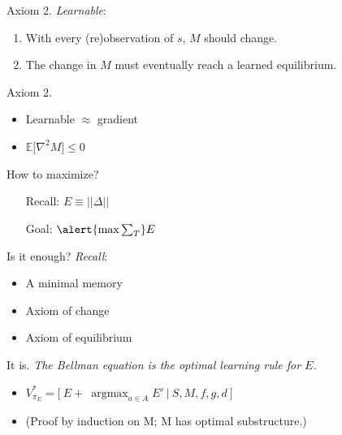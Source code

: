 \documentclass[10pt]{beamer}
\DeclareMathOperator*{\argmax}{argmax}
\begin{document}
\begin{frame}[fragile]{Axiom 2.}
\textit{Learnable}: 
\begin{enumerate}
    \item With every (re)observation of $s$, $M$ should change.
    \item The change in $M$ must eventually reach a learned equilibrium. 
\end{enumerate}
\end{frame}

\begin{frame}[fragile]{Axiom 2.}
\begin{itemize}
\item Learnable $\approx$ gradient
\item $\mathbb{E}\big [\nabla^2 M \big ] \leq 0$
\end{itemize}
\end{frame}

\begin{frame}[fragile]{How to maximize?}
\begin{itemize}
\item[Recall:] $E \equiv ||\Delta||$
\item[Goal:] $\alert{\max \sum_T} E$
\end{itemize}
\end{frame}

\begin{frame}[fragile]{Is it enough?}
\textit{Recall}:
\begin{itemize}
\item A minimal memory
\item Axiom of change
\item Axiom of equilibrium
\end{itemize}
\end{frame}

\begin{frame}[fragile]{It is.}
\textit{The Bellman equation is the optimal learning rule for $E$.}
\begin{itemize}
\item $V^*_{\pi_{E}} = \Big [\ E + \ \argmax_{a \in A} E'\ \Big |\ S, M, f, g, d \ \Big ]$
\item (Proof by induction on M; M has optimal substructure.)
\end{itemize}
\end{frame}
\end{document}
